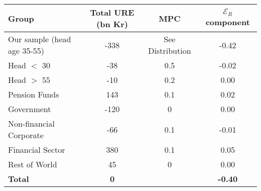 	\begin{tabular}{lccc}
		\centering
		Group & Total URE (bn Kr) & MPC & $\mathcal{E}_R$ component\\
		\hline
		Our sample (head age 35-55) & 	-338 & See Distribution & -0.42\\
		Head $<$ 30	& 					-38 & 	0.5	& -0.02\\
		Head $>$ 55 	& 				-10 & 0.2	&  0.00\\
		Pension Funds 	& 				143 & 0.1	& 0.02\\
		Government & 					-120 & 0	& 0.00 \\
		Non-financial Corporate & 		-66 & 0.1	& -0.01\\
		Financial Sector & 				 380 & 0.1	& 0.05\\
		Rest of World & 				 45 & 0	& 0.00\\
		\hline
		\textbf{Total} & \textbf{0} & & \textbf{-0.40}
	\end{tabular}